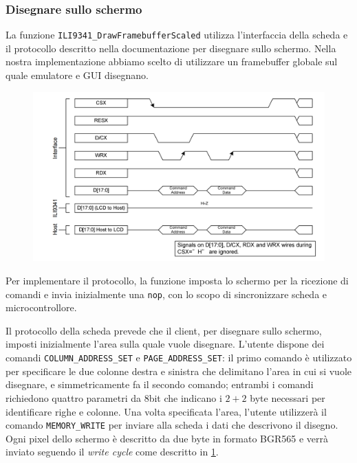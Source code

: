 \documentclass[hidelinks,12pt]{article}
\begin{document}
\subsubsection{Disegnare sullo schermo}
La funzione \texttt{ILI9341\_DrawFramebufferScaled} utilizza l'interfaccia della
scheda e il protocollo descritto nella documentazione per disegnare sullo
schermo. Nella nostra implementazione abbiamo scelto di utilizzare un framebuffer
globale sul quale emulatore e GUI disegnano.

\begin{figure}[h]
	\centering
	\includegraphics[scale=0.8]{figures/wr_cycle.png}
	\caption{}
	\label{fig:ili_wr_cycle}
\end{figure}

Per implementare il protocollo, la funzione imposta lo schermo per
la ricezione di comandi e invia inizialmente una \texttt{nop}, con lo scopo di
sincronizzare scheda e microcontrollore.

Il protocollo della scheda prevede che il client, per disegnare sullo schermo,
imposti inizialmente l'area sulla quale vuole disegnare.
L'utente dispone dei comandi \texttt{COLUMN\_ADDRESS\_SET} e
\texttt{PAGE\_ADDRESS\_SET}: il primo comando è utilizzato per specificare le
due colonne destra e sinistra che delimitano l'area in cui si vuole disegnare, e
simmetricamente fa il secondo comando; entrambi i comandi richiedono quattro
parametri da $8$bit che indicano i $2+2$ byte necessari per identificare righe e
colonne. Una volta specificata l'area, l'utente utilizzerà il comando
\texttt{MEMORY\_WRITE} per inviare alla scheda i dati che descrivono il disegno.
Ogni pixel dello schermo è descritto da due byte in formato BGR565 e verrà
inviato seguendo il \textit{write cycle} come descritto in
\cref{fig:ili_wr_cycle}.
\end{document}
